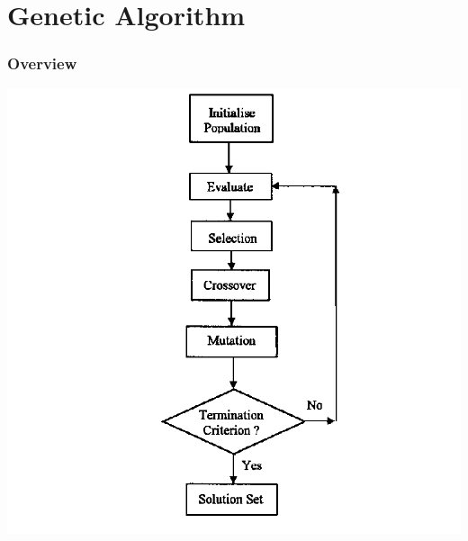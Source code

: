 \documentclass{beamer}
\begin{document}
\section{Genetic Algorithm}

\begin{frame}
\frametitle{Overview}
\begin{center}
\includegraphics[scale=0.25]{ga}

\end{center}
\end{frame}


%
%
%
\end{document}
